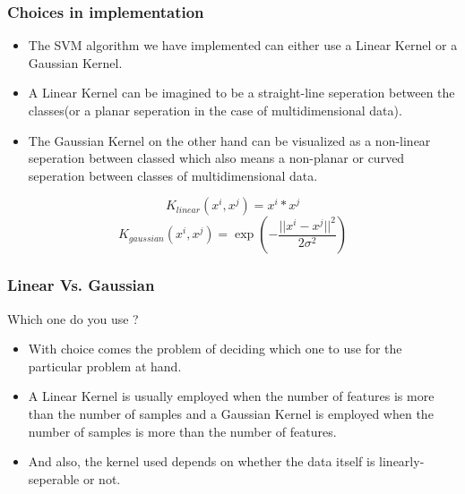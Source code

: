 \documentclass[11pt,xcolor=dvipsnames]{beamer}
\begin{document}
\begin{frame}
\frametitle{Choices in implementation}	
\begin{itemize}
\item The SVM algorithm we have implemented can either use a {\color{PineGreen}Linear Kernel} or a {\color{PineGreen}Gaussian Kernel}. \\
\item A {\color{PineGreen}Linear Kernel} can be imagined to be a {\color{PineGreen}straight-line seperation} between the classes(or a planar seperation in the case of multidimensional data).\\
\item The {\color{PineGreen}Gaussian Kernel} on the other hand can be visualized as a {\color{PineGreen}non-linear seperation} between classed which also means a non-planar or curved seperation between classes of multidimensional data.
\end{itemize}
\medskip
\begin{displaymath}K_{linear}(x^i, x^j) = x^i * x^j\end{displaymath}
\begin{displaymath}K_{gaussian}(x^i, x^j) = \exp(-\frac{||x^i - x^j||^2}{2\sigma^2})\end{displaymath}
\end{frame}


\begin{frame}
\frametitle{Linear Vs. Gaussian}
\begin{block}{Which one do you use ?}
\begin{itemize}
\item With choice comes the problem of deciding which one to use for the particular problem at hand.\\
\item A Linear Kernel is usually employed when the number of features is more than the number of samples and a Gaussian Kernel is employed when the number of samples is more than the number of features.\\
\item And also, the kernel used depends on whether the data itself is linearly-seperable or not.
\end{itemize}
\end{block}	
\end{frame}
\end{document}
